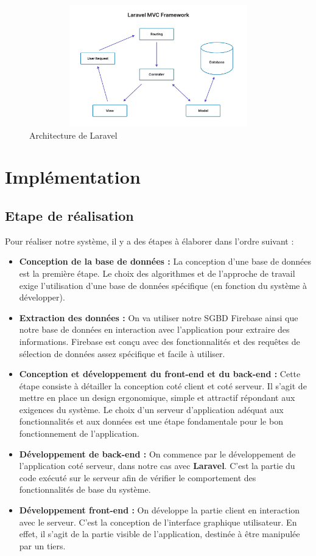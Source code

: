 \begin{figure}[h!]
	\includegraphics[width=500px,height=200px]{./Template LaTeX/Images/Laravel-MVC-framework.jpg}
	\caption{Architecture de Laravel}
	\label{fig:birds}
\end{figure}
\newpage
\section{Implémentation}
\subsection{Etape de réalisation}
Pour réaliser notre système, il y a des étapes à élaborer dans l’ordre suivant :
\begin{itemize}[label=$\ast$]
	\item \textbf{Conception de la base de données :} La conception d’une base de données est la
	première étape. Le choix des algorithmes et de l’approche de travail exige l’utilisation
	d’une base de données spécifique (en fonction du système à développer).
	\item \textbf{Extraction des données :}  On va utiliser notre SGBD Firebase ainsi que notre base de
	données en interaction avec l’application pour extraire des informations. Firebase est
	conçu avec des fonctionnalités et des requêtes de sélection de données assez spécifique
	et facile à utiliser.
	\item \textbf{Conception et développement du front-end et du back-end :} 
	Cette étape consiste à
	détailler la conception coté client et coté serveur. Il s’agit de mettre en place un design
	ergonomique, simple et attractif répondant aux exigences du système. Le choix d’un
	serveur d’application adéquat aux fonctionnalités et aux données est une étape
	fondamentale pour le bon fonctionnement de l’application.
	\item \textbf{Développement de back-end :} On commence par le développement de l’application coté
	serveur, dans notre cas avec \textbf{Laravel}. C’est la partie du code exécuté sur le serveur afin
	de vérifier le comportement des fonctionnalités de base du système.
	\item \textbf{Développement front-end :} On développe la partie client en interaction avec le serveur.
	C’est la conception de l'interface graphique utilisateur. En effet, il s'agit de la partie
	visible de l'application, destinée à être manipulée par un tiers.
\end{itemize}
